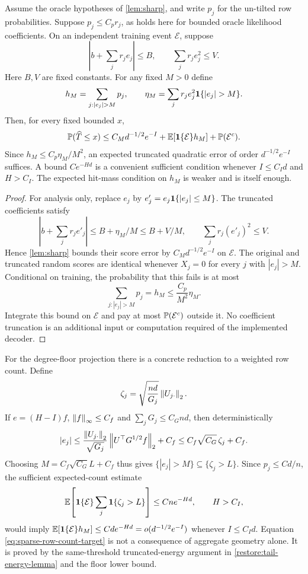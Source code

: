 \begin{lemma}
\label{lem:sparse-truncated-transfer}
Assume the oracle hypotheses of \cref{lem:sharp}, and write $p_j$
for the un-tilted row probabilities. Suppose $p_j\le C_pr_j$, as
holds here for bounded oracle likelihood coefficients. On an independent
training event $\mathcal E$, suppose
\[
 \left|b+\sum_jr_je_j\right|\le B,\qquad \sum_jr_je_j^2\le V.
\]
Here $B,V$ are fixed constants. For any fixed $M>0$ define
\[
 h_M=\sum_{j:|e_j|>M}p_j,\qquad
 \eta_M=\sum_jr_je_j^2\ind{|e_j|>M}.
\]
Then, for every fixed bounded $x$,
\begin{equation}\label{eq:sparse-truncated-transfer}
 \mathbb P(\widehat T\le x)
 \le C_Md^{-1/2}e^{-I}
       +\mathbb E[\mathbf1\{\mathcal E\}h_M]
       +\mathbb P(\mathcal E^c).
\end{equation}
Since $h_M\le C_p\eta_M/M^2$, an expected truncated quadratic error of order
$d^{-1/2}e^{-I}$ suffices. A bound $Ce^{-Hd}$ is a convenient
sufficient condition whenever $I\le C_Id$ and $H>C_I$.
The expected hit-mass condition on $h_M$ is weaker and is itself enough.
\end{lemma}

\begin{proof}
For analysis only, replace $e_j$ by
$e'_j=e_j\mathbf1\{|e_j|\le M\}$. The truncated coefficients satisfy
\[
 \left|b+\sum_jr_je'_j\right|
 \le B+\eta_M/M\le B+V/M,\qquad
 \sum_jr_j(e'_j)^2\le V.
\]
Hence \cref{lem:sharp} bounds their score error by
$C_Md^{-1/2}e^{-I}$ on $\mathcal E$.
The original and truncated random scores are identical whenever
$X_j=0$ for every $j$ with $|e_j|>M$. Conditional on training, the
probability that this fails is at most
\[
 \sum_{j:|e_j|>M}p_j
 =h_M\le \frac{C_p}{M^2}\eta_M.
\]
Integrate this bound on $\mathcal E$ and pay at most
$\mathbb P(\mathcal E^c)$ outside it. No coefficient truncation is an
additional input or computation required of the implemented decoder.
\end{proof}

For the degree-floor projection there is a concrete reduction to a
weighted row count. Define
\[
 \zeta_j=\sqrt{\frac{nd}{G_j}}\left\lVert U_{j\cdot}\right\rVert_2.
\]
If $e=(H-I)f$, $\left\lVert f\right\rVert_\infty\le C_f$ and
$\sum_jG_j\le C_Gnd$, then deterministically
\[
 |e_j|
 \le \frac{\left\lVert U_{j\cdot}\right\rVert_2}{\sqrt{G_j}}
        \left\lVert U^\top G^{1/2}f\right\rVert_2+C_f
 \le C_f\sqrt{C_G}\,\zeta_j+C_f.
\]
Choosing $M=C_f\sqrt{C_G}L+C_f$ thus gives
$\{|e_j|>M\}\subseteq\{\zeta_j>L\}$. Since $p_j\le Cd/n$,
the sufficient expected-count estimate
\begin{equation}\label{eq:sparse-row-count-target}
 \mathbb E\!\left[\mathbf1\{\mathcal E\}
       \sum_j\mathbf1\{\zeta_j>L\}\right]\le Cne^{-Hd},
 \qquad H>C_I,
\end{equation}
would imply
$\mathbb E[\mathbf1\{\mathcal E\}h_M]\le Cd e^{-Hd}
=o(d^{-1/2}e^{-I})$ whenever $I\le C_Id$.
Equation \eqref{eq:sparse-row-count-target} is not a consequence of
aggregate geometry alone. It is proved by the same-threshold
truncated-energy argument in \cref{restore:tail-energy-lemma}
and the floor lower bound.

